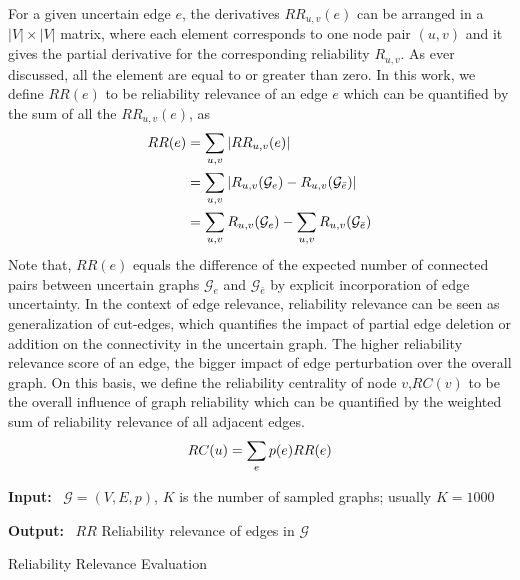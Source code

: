 For a given uncertain edge $e$, the derivatives $RR_{u,v}(e)$ can be arranged in a $|V|\times |V|$ matrix, where each element corresponds to one node pair $(u,v)$ and it gives the partial derivative for the corresponding reliability $R_{u,v}$. As ever discussed, all the element are equal to or greater than zero.  
In this work, we define $RR(e)$ to be reliability relevance of an edge $e$ which can be quantified by the sum of all the $RR_{u,v}(e)$, as  
\vj
\begin{align*}
    RR(e) &= \sum_{u,v} |RR_{u,v}(e)| \\
          &= \sum_{u,v} |R_{u,v}(\mathcal{G}_{e}) -R_{u,v}(\mathcal{G}_{\bar{e}})| \\  
         &= \sum_{u,v} R_{u,v} (\mathcal{G}_{e}) - \sum_{u,v} R_{u,v}(\mathcal{G}_{\bar{e}})
    \svj 
\end{align*}
Note that, $RR(e)$ equals the difference of the expected number of connected pairs between uncertain graphs $\mathcal{G}_{e}$ and $\mathcal{G}_{\bar{e}}$ by explicit incorporation of edge uncertainty. In the context of edge relevance, reliability relevance can be seen as generalization of cut-edges, which quantifies the impact of partial edge deletion or addition on the connectivity in the uncertain graph. 
The higher reliability relevance score of an edge, the bigger impact of edge perturbation over the overall graph.  
On this basis, we define the reliability centrality of node $v$,$RC(v)$ to be the overall influence of graph reliability which can be quantified by the weighted sum of reliability relevance of all adjacent edges. 
\svj
\begin{equation*}
    RC(u)=\sum_{e} p(e) RR(e)
    \svj
\end{equation*}

\begin{algorithm}[!tb]
    \begin{algorithmic}[1]
       \item[] {\textbf{Input:} ~$\mathcal{G}=(V,E,\mathit{p})$, $K$ is the number of sampled graphs; usually $K=1000$}
    \item[] {\textbf{Output:} ~$RR$ Reliability relevance of edges in $\mathcal{G}$}
    \ENDFOR
         \caption{Reliability Relevance Evaluation}
        \label{alg:RReval}
    \end{algorithmic}
\end{algorithm}


